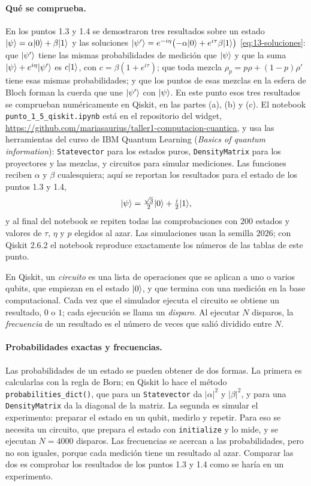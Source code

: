 \paragraph{Qué se comprueba.} En los puntos 1.3 y 1.4 se demostraron tres resultados sobre un
estado $\lvert \psi\rangle=\alpha\lvert 0\rangle+\beta\lvert 1\rangle$ y las soluciones
$\lvert \psi'\rangle=e^{-i\eta}\bigl(-\alpha\lvert 0\rangle+e^{i\tau}\beta\lvert 1\rangle\bigr)$ \eqref{eq:13-soluciones}:
que $\lvert \psi'\rangle$ tiene las mismas probabilidades de medición que $\lvert \psi\rangle$ y que la suma
$\lvert \psi\rangle+e^{i\eta}\lvert \psi'\rangle$ es $c\lvert 1\rangle$, con $c=\beta(1+e^{i\tau})$; que toda mezcla
$\rho_p=p\rho+(1-p)\rho'$ tiene esas mismas probabilidades; y que los puntos de esas mezclas en la
esfera de Bloch forman la cuerda que une $\lvert \psi'\rangle$ con $\lvert \psi\rangle$. En este punto esos tres
resultados se comprueban numéricamente en Qiskit, en las partes (a), (b) y (c). El notebook
\texttt{punto\_1\_5\_qiskit.ipynb} está en el repositorio del widget,
\url{https://github.com/mariasaurius/taller1-computacion-cuantica}, y usa las herramientas del
curso de IBM Quantum Learning (\emph{Basics of quantum information}): \texttt{Statevector} para
los estados puros, \texttt{DensityMatrix} para los proyectores y las mezclas, y circuitos para
simular mediciones. Las funciones reciben $\alpha$ y $\beta$ cualesquiera; aquí se reportan los
resultados para el estado de los puntos 1.3 y 1.4,
\[
  \lvert \psi\rangle=\tfrac{\sqrt3}{2}\lvert 0\rangle+\tfrac{i}{2}\lvert 1\rangle ,
\]
y al final del notebook se repiten todas las comprobaciones con $200$ estados y valores de
$\tau$, $\eta$ y $p$ elegidos al azar. Las simulaciones usan la semilla $2026$; con Qiskit 2.6.2
el notebook reproduce exactamente los números de las tablas de este punto.

\begin{definicionT}
En Qiskit, un \emph{circuito} es una lista de operaciones que se aplican a uno o varios qubits,
que empiezan en el estado $\lvert 0\rangle$, y que termina con una medición en la base computacional. Cada
vez que el simulador ejecuta el circuito se obtiene un resultado, $0$ o $1$; cada ejecución se
llama un \emph{disparo}. Al ejecutar $N$ disparos, la \emph{frecuencia} de un resultado es el
número de veces que salió dividido entre $N$.
\end{definicionT}

\paragraph{Probabilidades exactas y frecuencias.} Las probabilidades de un estado se pueden
obtener de dos formas. La primera es calcularlas con la regla de Born; en Qiskit lo hace el
método \texttt{probabilities\_\allowbreak dict()}, que para un \texttt{Statevector} da $|\alpha|^2$ y
$|\beta|^2$, y para una \texttt{DensityMatrix} da la diagonal de la matriz. La segunda es simular
el experimento: preparar el estado en un qubit, medirlo y repetir. Para eso se necesita un
circuito, que prepara el estado con \texttt{initialize} y lo mide, y se ejecutan $N=4000$
disparos. Las frecuencias se acercan a las probabilidades, pero no son iguales, porque cada
medición tiene un resultado al azar. Comparar las dos es comprobar los resultados de los puntos
1.3 y 1.4 como se haría en un experimento.

